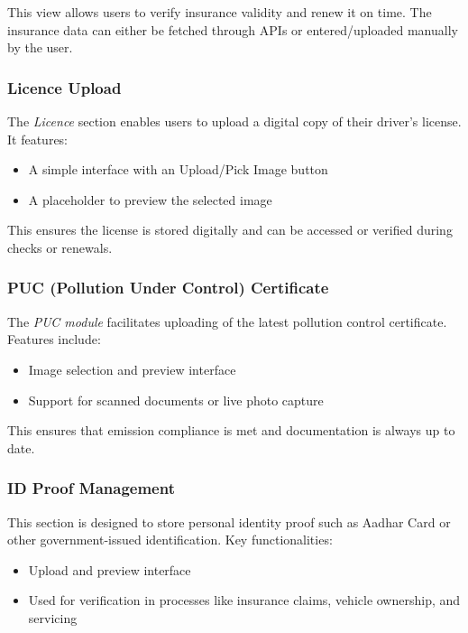 This view allows users to verify insurance validity and renew it on time. The insurance data can either be fetched through APIs or entered/uploaded manually by the user.

\subsubsection{Licence Upload}

The \textit{Licence} section enables users to upload a digital copy of their driver’s license. It features:

\begin{itemize}
    \item A simple interface with an Upload/Pick Image button
    \item A placeholder to preview the selected image
\end{itemize}

This ensures the license is stored digitally and can be accessed or verified during checks or renewals.

\subsubsection{PUC (Pollution Under Control) Certificate}

The \textit{PUC module} facilitates uploading of the latest pollution control certificate. Features include:

\begin{itemize}
    \item Image selection and preview interface
    \item Support for scanned documents or live photo capture
\end{itemize}

This ensures that emission compliance is met and documentation is always up to date.

\subsubsection{ID Proof Management}

This section is designed to store personal identity proof such as Aadhar Card or other government-issued identification. Key functionalities:

\begin{itemize}
    \item Upload and preview interface
    \item Used for verification in processes like insurance claims, vehicle ownership, and servicing
\end{itemize}

